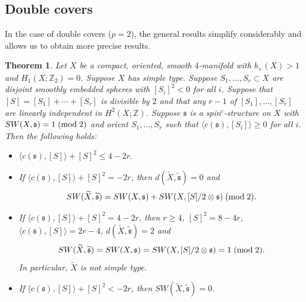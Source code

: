 \documentclass{amsart}
\newtheorem{theorem}{Theorem}[section]
\theoremstyle{definition}
\theoremstyle{remark}
\numberwithin{equation}{section}
\begin{document}
\subsection{Double covers}

In the case of double covers ($p=2$), the general results simplify considerably and allows us to obtain more precise results.


\begin{theorem}\label{thm:p=2}
Let $X$ be a compact, oriented, smooth $4$-manifold with $b_+(X) > 1$ and $H_1(X ; \mathbb{Z}_2) = 0$. Suppose $X$ has simple type. Suppose $S_1, \dots , S_r \subset X$ are disjoint smoothly embedded spheres with $[S_i]^2 < 0$ for all $i$. Suppose that $[S] = [S_1] + \cdots + [S_r]$ is divisible by $2$ and that any $r-1$ of $[S_1], \dots , [S_r]$ are linearly independent in $H^2(X ; \mathbb{Z})$. Suppose $\mathfrak{s}$ is a spin$^c$-structure on $X$ with $SW(X , \mathfrak{s}) = 1 \; ({\rm mod} \; 2)$ and orient $S_1, \dots , S_r$ such that $\langle c(\mathfrak{s}) , [S_i] \rangle \ge 0$ for all $i$. Then the following holds:
\begin{itemize}
\item[(1)]{$ \langle c(\mathfrak{s}) , [S] \rangle + [S]^2 \le 4 - 2r.$}
\item[(2)]{If $\langle c(\mathfrak{s}) , [S] \rangle + [S]^2 = -2r$, then $d(\widetilde{X} , \widetilde{\mathfrak{s}}) = 0$ and
\[
SW(\widetilde{X} , \widetilde{\mathfrak{s}}) = SW(X , \mathfrak{s}) + SW(X , [S]/2 \otimes \mathfrak{s}) \; ({\rm mod} \; 2).
\]
}
\item[(3)]{If $\langle c(\mathfrak{s}) , [S] \rangle + [S]^2 = 4-2r$, then $r \ge 4$, $[S]^2 = 8-4r$, $\langle c(\mathfrak{s}) , [S] \rangle = 2r-4$, $d(\widetilde{X} , \widetilde{\mathfrak{s}}) = 2$ and
\[
SW(\widetilde{X} , \widetilde{\mathfrak{s}}) = SW(X , \mathfrak{s}) = SW(X , [S]/2 \otimes \mathfrak{s}) = 1 \; ({\rm mod} \; 2).
\]
In particular, $\widetilde{X}$ is not simple type.
}
\item[(4)]{If $\langle c(\mathfrak{s}) , [S] \rangle + [S]^2 < -2r$, then $SW(\widetilde{X} , \widetilde{\mathfrak{s}}) = 0$.}
\end{itemize}
\end{theorem}
\end{document}
